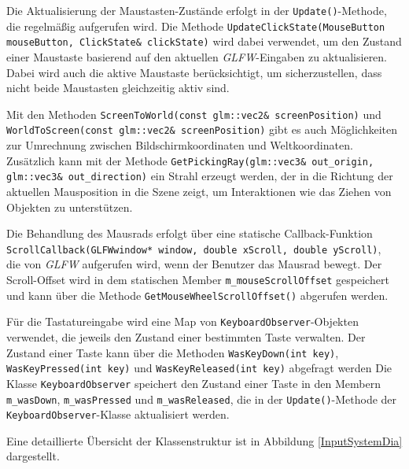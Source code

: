 Die Aktualisierung der Maustasten-Zustände erfolgt in der \texttt{Update()}-Methode, die regelmäßig aufgerufen wird. Die Methode \texttt{UpdateClickState(MouseButton mouseButton, ClickState\& clickState)} wird dabei verwendet, um den Zustand einer Maustaste basierend auf den aktuellen \textit{GLFW}-Eingaben zu aktualisieren. Dabei wird auch die aktive Maustaste berücksichtigt, um sicherzustellen, dass nicht beide Maustasten gleichzeitig aktiv sind.

Mit den Methoden \texttt{ScreenToWorld(const glm::vec2\& screenPosition)} und \texttt{WorldToScreen(const glm::vec2\& screenPosition)} gibt es auch Möglichkeiten zur Umrechnung zwischen Bildschirmkoordinaten und Weltkoordinaten. Zusätzlich kann mit der Methode \texttt{GetPickingRay(glm::vec3\& out\_origin, glm::vec3\& out\_direction)} ein Strahl erzeugt werden, der in die Richtung der aktuellen Mausposition in die Szene zeigt, um Interaktionen wie das Ziehen von Objekten zu unterstützen.

Die Behandlung des Mausrads erfolgt über eine statische Callback-Funktion \\\texttt{ScrollCallback(GLFWwindow* window, double xScroll, double yScroll)}, \\die von \textit{GLFW} aufgerufen wird, wenn der Benutzer das Mausrad bewegt. Der Scroll-Offset wird in dem statischen Member \texttt{m\_mouseScrollOffset} gespeichert und kann über die Methode \texttt{GetMouseWheelScrollOffset()} abgerufen werden. 

Für die Tastatureingabe wird eine Map von \texttt{KeyboardObserver}-Objekten verwendet, die jeweils den Zustand einer bestimmten Taste verwalten. Der Zustand einer Taste kann über die Methoden \texttt{WasKeyDown(int key)}, \texttt{WasKeyPressed(int key)} und \texttt{WasKeyReleased(int key)} abgefragt werden Die Klasse \texttt{KeyboardObserver} speichert den Zustand einer Taste in den Membern \texttt{m\_wasDown}, \texttt{m\_wasPressed} und \texttt{m\_wasReleased}, die in der \texttt{Update()}-Methode der \texttt{KeyboardObserver}-Klasse aktualisiert werden. 

Eine detaillierte Übersicht der Klassenstruktur ist in Abbildung \ref{InputSystemDia} dargestellt.

